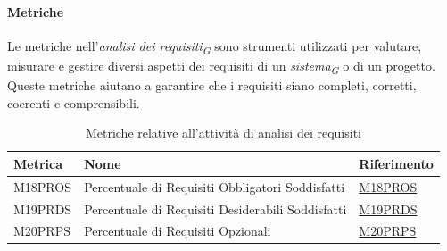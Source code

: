 \paragraph{Metriche}
Le metriche nell'\textit{analisi dei requisiti}\textsubscript{\textit{G}} sono strumenti utilizzati per valutare, misurare e gestire diversi aspetti dei requisiti di un \textit{sistema}\textsubscript{\textit{G}} o di un progetto. Queste metriche aiutano a garantire che i requisiti siano completi, corretti, coerenti e comprensibili.
\begin{table}[H]
    \centering
    \begin{tabular}{|C{3cm}|C{3cm}|C{4cm}|}
    \hline
    Metrica & Nome & Riferimento \\
    \hline \hline
    M18PROS & Percentuale di Requisiti Obbligatori Soddisfatti &  \hyperlink{item:M18PROS}{M18PROS} \\
    M19PRDS & Percentuale di Requisiti Desiderabili Soddisfatti &  \hyperlink{item:M19PRDS}{M19PRDS} \\
    M20PRPS & Percentuale di Requisiti Opzionali & \hyperlink{item:M20PRPS}{M20PRPS} \\
    \hline
    \end{tabular}
    \caption{Metriche relative all'attività di analisi dei requisiti}
\end{table}

